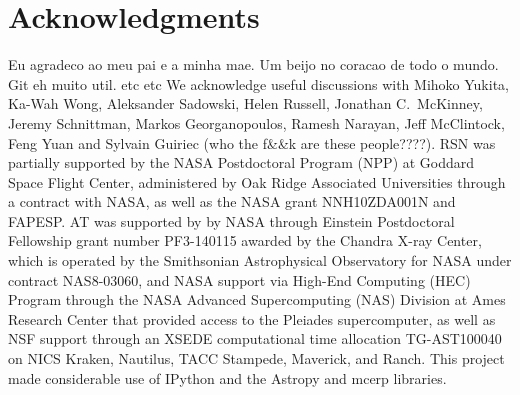 \documentclass[useAMS,usenatbib]{mn2e}
\begin{document}
\section*{Acknowledgments}

Eu agradeco ao meu pai e a minha mae. Um beijo no coracao de todo o mundo. Git eh muito util. etc etc
We acknowledge useful discussions with Mihoko Yukita, Ka-Wah Wong, Aleksander Sadowski, Helen Russell, Jonathan C.~McKinney, Jeremy Schnittman, Markos Georganopoulos, Ramesh Narayan, Jeff McClintock, Feng Yuan and Sylvain Guiriec (who the f&&k are these people????). RSN was partially supported by the NASA Postdoctoral Program (NPP) at Goddard Space Flight Center, administered by Oak Ridge Associated Universities through a contract with NASA, as well as the NASA grant NNH10ZDA001N and FAPESP. AT was supported by by NASA through Einstein Postdoctoral Fellowship grant number PF3-140115 awarded by the Chandra X-ray Center, which is operated by the Smithsonian Astrophysical Observatory for NASA under contract NAS8-03060, and NASA support via High-End Computing (HEC) Program through the NASA Advanced Supercomputing (NAS) Division at Ames Research Center that provided access to the Pleiades supercomputer, as well as NSF support through an XSEDE computational time allocation TG-AST100040 on NICS Kraken, Nautilus, TACC Stampede, Maverick, and Ranch. This project made considerable use of IPython \citep{ipython} and the Astropy and mcerp libraries.



%




\bsp

\label{lastpage}
\end{document}
